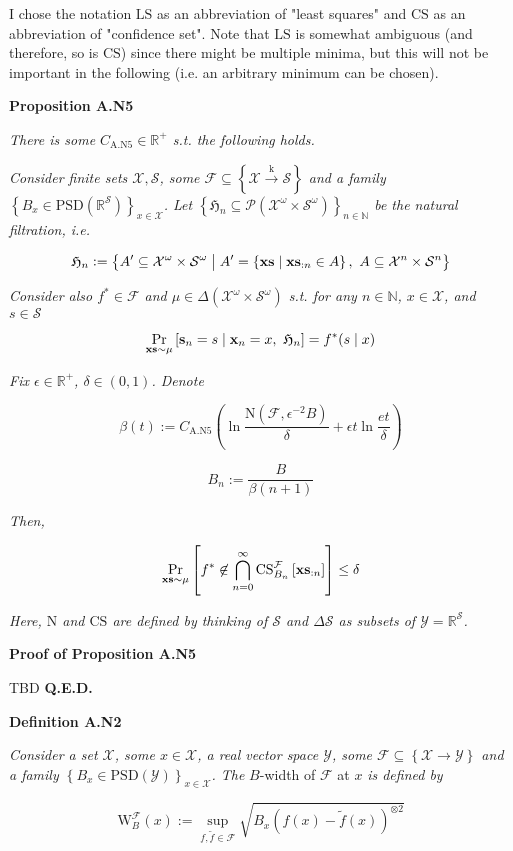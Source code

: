 \documentclass[a4paper]{article}
\newcommand{\Co}[1]{}
\newcommand{\AP}[1]{\left(#1\right)}
\newcommand{\AB}[1]{\left[#1\right]}
\newcommand{\AC}[1]{\left\{#1\right\}}
\newcommand{\ABM}[2]{\left[#1\;\middle\vert\;#2\right]}
\newcommand{\ACM}[2]{\left\{#1\;\middle\vert\;#2\right\}}
\newcommand{\Pa}[2]{\underset{#1}{\operatorname{Pr}}\AB{#2}}
\newcommand{\CP}[3]{\underset{#1}{\operatorname{Pr}}\ABM{#2}{#3}}
\newcommand{\PS}[1]{\mathcal{P}\AP{#1}}
\newcommand{\Nats}{\mathbb{N}}
\newcommand{\Reals}{\mathbb{R}}
\newcommand{\PSD}{\mathrm{PSD}}
\newcommand{\K}{\xrightarrow{\mathrm{k}}}
\newcommand{\B}{B}
\newcommand{\X}{\mathcal{X}}
\newcommand{\Y}{\mathcal{Y}}
\newcommand{\F}{\mathcal{F}}
\newcommand{\St}{\mathcal{S}}
\newcommand{\N}{\mathrm{N}}
\newcommand{\LS}{\mathrm{LS}}
\newcommand{\CS}{\mathrm{CS}}
\newcommand{\W}{\mathrm{W}}
\begin{document}
I chose the notation $\LS$ as an abbreviation of "least squares" and $\CS$ as an abbreviation of "confidence set". Note that $\LS$ is somewhat ambiguous (and therefore, so is $\CS$) since there might be multiple minima, but this will not be important in the following (i.e. an arbitrary minimum can be chosen).

\textbf{Proposition A.N5}\Co{b}

\textit{There is some $C_{\mathrm{A.N5}}\in\Reals^+$ s.t. the following holds.}\Co{i}

\textit{Consider finite sets $\X,\St$, some $\F\subseteq\AC{\X\K\St}$ and a family $\AC{\B _x\in\PSD\AP{\Reals^\St}}_{x\in\X}$. Let $\AC{\mathfrak{H}_n\subseteq\PS{\X^\omega\times\St^\omega}}_{n\in\Nats}$ be the natural filtration, i.e.}\Co{i}

$$\mathfrak{H}_n:=\ACM{A'\subseteq\X^\omega\times\St^\omega}{A'=\ACM{\bold{xs}}{\bold{xs}_{:n}\in A},\ A\subseteq\X^n\times\St^n}$$

\textit{Consider also $f^*\in\F$ and $\mu\in\Delta\AP{\X^\omega\times\St^\omega}$ s.t. for any $n\in\Nats$, $x\in\X$, and $s\in\St$}\Co{i}

$$\CP{\bold{xs}\sim\mu}{\bold{s}_n=s}{\bold{x}_n=x,\ \mathfrak{H}_n} = f^*(s\mid x)$$

\textit{Fix $\epsilon\in\Reals^+$, $\delta\in(0,1)$. Denote}\Co{i}

$$\beta(t):=C_{\mathrm{A.N5}}\AP{\ln{\frac{\N(\F,\epsilon^{-2}\B )}{\delta}}+\epsilon t\ln{\frac{et}{\delta}}}$$

$$\B _n:=\frac{\B }{\beta(n+1)}$$

\textit{Then,}\Co{i}

$$\Pa{\bold{xs}\sim\mu}{f^*\not\in\bigcap_{n=0}^\infty\CS^\F_{\B _n}\AB{\bold{xs}_{:n}}} \leq \delta$$

\textit{Here, $\N$ and $\CS$ are defined by thinking of $\St$ and $\Delta\St$ as subsets of $\Y=\Reals^\St$.}\Co{i}

\textbf{Proof of Proposition A.N5}\Co{b}

TBD \textbf{Q.E.D.}\Co{b}

\Co{b}

\textbf{Definition A.N2}\Co{b}

\textit{Consider a set $\X$, some $x\in\X$, a real vector space $\Y$, some $\F\subseteq\AC{\X\rightarrow\Y}$ and a family $\AC{\B _x\in\PSD(\Y)}_{x\in\X}$. The}\Co{i} $\B $-width of $\F$ at $x$ \textit{is defined by}\Co{i}

$$\W^\F_\B (x):=\sup_{f,\tilde{f}\in\F}\sqrt{\B _x\AP{f(x)-\tilde{f}(x)}^{\otimes2}}$$  
\end{document}
